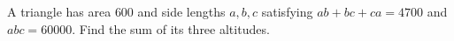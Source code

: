 A triangle has area $600$ and side lengths $a,b,c$ satisfying $ab+bc+ca=4700$ and $abc=60000$. Find the sum of its three altitudes.
